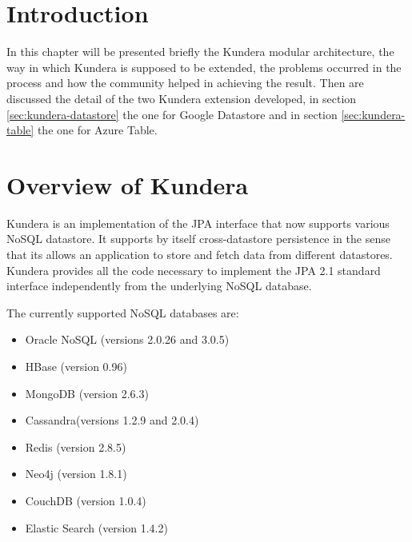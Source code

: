 \section{Introduction}
In this chapter will be presented briefly the Kundera modular architecture, the way in which Kundera is supposed to be extended, the problems occurred in the process and how the community helped in achieving the result.
Then are discussed the detail of the two Kundera extension developed, in section \ref{sec:kundera-datastore} the one for Google Datastore and in section \ref{sec:kundera-table} the one for Azure Table.

\section{Overview of Kundera}
Kundera \cite{online:kundera} is an implementation of the JPA interface that now supports various NoSQL datastore. It supports by itself cross-datastore persistence in the sense that its allows an application to store and fetch data from different datastores.
Kundera provides all the code necessary to implement the JPA 2.1 standard interface independently from the underlying NoSQL database. 

\newparagraph The currently supported NoSQL databases are:
\begin{itemize}
\item Oracle NoSQL (versions 2.0.26 and 3.0.5)
\item HBase (version 0.96)
\item MongoDB (version 2.6.3)
\item Cassandra(versions 1.2.9 and 2.0.4)
\item Redis (version 2.8.5)
\item Neo4j (version 1.8.1)
\item CouchDB (version 1.0.4)
\item Elastic Search (version 1.4.2)
\end{itemize}

